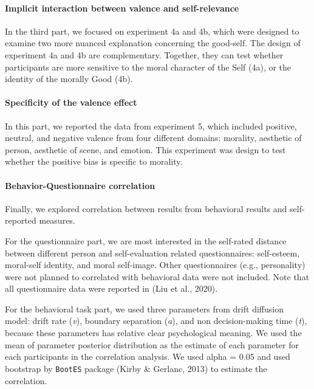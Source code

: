\documentclass[
  english,
  man]{apa6}
\let\oldparagraph\paragraph
\renewcommand{\paragraph}[1]{\oldparagraph{#1}\mbox{}}
\begin{document}
\hypertarget{implicit-interaction-between-valence-and-self-relevance}{%
\paragraph{Implicit interaction between valence and self-relevance}\label{implicit-interaction-between-valence-and-self-relevance}}

In the third part, we focused on experiment 4a and 4b, which were designed to examine two more nuanced explanation concerning the good-self. The design of experiment 4a and 4b are complementary. Together, they can test whether participants are more sensitive to the moral character of the Self (4a), or the identity of the morally Good (4b).

\hypertarget{specificity-of-the-valence-effect}{%
\paragraph{Specificity of the valence effect}\label{specificity-of-the-valence-effect}}

In this part, we reported the data from experiment 5, which included positive, neutral, and negative valence from four different domains: morality, aesthetic of person, aesthetic of scene, and emotion. This experiment was design to test whether the positive bias is specific to morality.

\hypertarget{behavior-questionnaire-correlation}{%
\paragraph{Behavior-Questionnaire correlation}\label{behavior-questionnaire-correlation}}

Finally, we explored correlation between results from behavioral results and self-reported measures.

For the questionnaire part, we are most interested in the self-rated distance between different person and self-evaluation related questionnaires: self-esteem, moral-self identity, and moral self-image. Other questionnaires (e.g., personality) were not planned to correlated with behavioral data were not included. Note that all questionnaire data were reported in (Liu et al., 2020).

For the behavioral task part, we used three parameters from drift diffusion model: drift rate (\emph{v}), boundary separation (\emph{a}), and non decision-making time (\emph{t}), because these parameters has relative clear psychological meaning. We used the mean of parameter posterior distribution as the estimate of each parameter for each participants in the correlation analysis. We used alpha = 0.05 and used bootstrap by \texttt{BootES} package (Kirby \& Gerlanc, 2013) to estimate the correlation.
\end{document}
